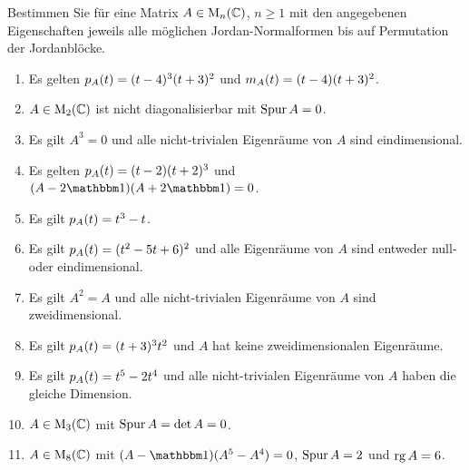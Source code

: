 \documentclass[a4paper, 10pt]{scrartcl}
\begin{document}
\begin{question}
  Bestimmen Sie für eine Matrix $A \in \operatorname{M}_{n}(\mathbb{C})$, $n \geq 1$ mit den angegebenen Eigenschaften jeweils alle möglichen Jordan-Normalformen bis auf Permutation der Jordanblöcke.
  \begin{enumerate}
    \item
      Es gelten $p_{A}(t) = (t-4)^3 (t+3)^2$ und $m_{A}(t) = (t-4) (t+3)^2$.
    \item
      $A\in \operatorname{M}_{2}(\mathbb{C})$ ist nicht diagonalisierbar mit $\operatorname{Spur} A = 0$.
    \item
      Es gilt $A^3 = 0$ und alle nicht-trivialen Eigenräume von $A$ sind eindimensional.
    \item
      Es gelten $p_{A}(t) = (t-2)(t+2)^3$ und $(A - 2 \Id)(A + 2 \Id) = 0$.
    \item
      Es gilt $p_{A}(t) = t^3 - t$.
    \item
      Es gilt $p_{A}(t) = (t^2 - 5t + 6)^2$ und alle Eigenräume von $A$ sind entweder null- oder eindimensional.
    \item
      Es gilt $A^2 = A$ und alle nicht-trivialen Eigenräume von $A$ sind zweidimensional.
    \item
      Es gilt $p_{A}(t) = (t + 3)^3 t^2$ und $A$ hat keine zweidimensionalen Eigenräume.
    \item
      Es gilt $p_{A}(t) = t^5 -2 t^4$ und alle nicht-trivialen Eigenräume von $A$ haben die gleiche Dimension.
    \item
      $A \in \operatorname{M}_{3}(\mathbb{C})$ mit $\operatorname{Spur} A = \det A = 0$.
    \item
      $A \in \operatorname{M}_{8}(\mathbb{C})$ mit $(A - \Id)(A^5 - A^4) = 0$, $\operatorname{Spur} A = 2$ und $\operatorname{rg} A = 6$.
  \end{enumerate}
\end{question}
\end{document}
